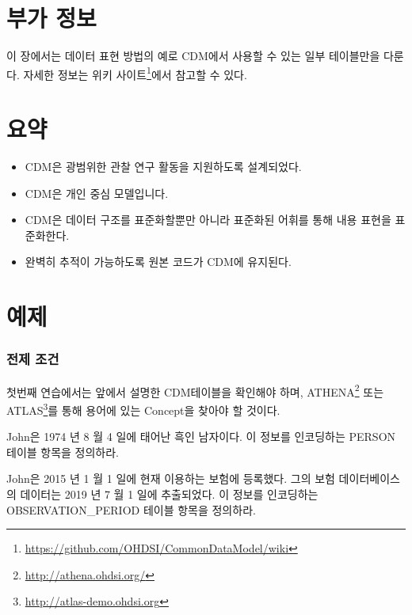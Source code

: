\documentclass[11pt]{book}
\let\rmarkdownfootnote\footnote%
\def\footnote{\protect\rmarkdownfootnote}
\theoremstyle{definition}
\theoremstyle{definition}
\theoremstyle{definition}
\theoremstyle{remark}
\let\BeginKnitrBlock\begin \let\EndKnitrBlock\end
\begin{document}
\section{부가 정보}\label{-}

이 장에서는 데이터 표현 방법의 예로 CDM에서 사용할 수 있는 일부
테이블만을 다룬다. 자세한 정보는 위키 사이트\footnote{\url{https://github.com/OHDSI/CommonDataModel/wiki}}에서
참고할 수 있다.

\section{요약}

\BeginKnitrBlock{rmdsummary}
\begin{itemize}
\item
  CDM은 광범위한 관찰 연구 활동을 지원하도록 설계되었다.
\item
  CDM은 개인 중심 모델입니다.
\item
  CDM은 데이터 구조를 표준화할뿐만 아니라 표준화된 어휘를 통해 내용
  표현을 표준화한다.
\item
  완벽히 추적이 가능하도록 원본 코드가 CDM에 유지된다.
\end{itemize}
\EndKnitrBlock{rmdsummary}

\section{예제}

\subsubsection*{전제 조건}\label{-}

첫번째 연습에서는 앞에서 설명한 CDM테이블을 확인해야 하며,
ATHENA\footnote{\url{http://athena.ohdsi.org/}} 또는 ATLAS\footnote{\url{http://atlas-demo.ohdsi.org}}를
통해 용어에 있는 Concept을 찾아야 할 것이다.

\BeginKnitrBlock{exercise}
\protect\hypertarget{exr:exerciseJohnPerson}{}{\label{exr:exerciseJohnPerson}
}John은 1974 년 8 월 4 일에 태어난 흑인 남자이다. 이 정보를 인코딩하는
PERSON 테이블 항목을 정의하라.
\EndKnitrBlock{exercise}

\BeginKnitrBlock{exercise}
\protect\hypertarget{exr:exerciseJohnOp}{}{\label{exr:exerciseJohnOp}
}John은 2015 년 1 월 1 일에 현재 이용하는 보험에 등록했다. 그의 보험
데이터베이스의 데이터는 2019 년 7 월 1 일에 추출되었다. 이 정보를
인코딩하는 OBSERVATION\_PERIOD 테이블 항목을 정의하라.
\EndKnitrBlock{exercise}
\end{document}
